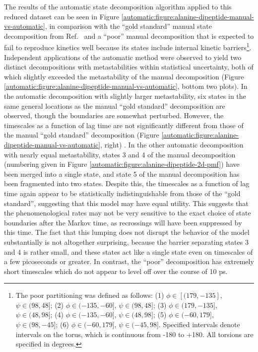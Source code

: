 The results of the automatic state decomposition algorithm applied to this reduced dataset can be seen in Figure \ref{automatic:figure:alanine-dipeptide-manual-vs-automatic}, in comparison with the ``gold standard'' manual state decomposition from Ref.\ \cite{chodera:mms:2006} and a ``poor'' manual decomposition that is expected to fail to reproduce kinetics well because its states include internal kinetic barriers\footnote{The poor partitioning was defined as follows: (1) $\phi \in [(179,-135]$, $\psi \in (98,48]$; (2) $\phi \in (-135,-60]$, $\psi \in (98,48]$; (3) $\phi \in (179,-135]$, $\psi \in (48,98]$; (4) $\phi \in (-135,-60]$, $\psi \in (48,98]$; (5) $\phi \in (-60,179]$, $\psi \in (98,-45]$; (6) $\phi \in (-60,179]$, $\psi \in (-45,98]$.  Specified intervals denote intervals on the torus, which is continuous from -180 to +180.  All torsions are specified in degrees.}.
Independent applications of the automatic method were observed to yield two distinct decompositions with metastabilities within statistical uncertainty, both of which slightly exceeded the metastability of the manual decomposition (Figure \ref{automatic:figure:alanine-dipeptide-manual-vs-automatic}, bottom two plots).
In the automatic decomposition with slightly larger metastability, six states in the same general locations as the manual ``gold standard'' decomposition are observed, though the boundaries are somewhat perturbed.
However, the timescales as a function of lag time are not significantly different from those of the manual ``gold standard'' decomposition  (Figure \ref{automatic:figure:alanine-dipeptide-manual-vs-automatic}, right) .
In the other automatic decomposition with nearly equal metastability, states 3 and 4 of the manual decomposition (numbering given in Figure \ref{automatic:figure:alanine-dipeptide-2d-pmf}) have been merged into a single state, and state 5 of the manual decomposition has been fragmented into two states.
Despite this, the timescales as a function of lag time again appear to be statistically indistinguishable from those of the ``gold standard'', suggesting that this model may have equal utility.
This suggests that the phenomenological rates may not be very sensitive to the exact choice of state boundaries after the Markov time, as recrossings will have been suppressed by this time.
The fact that this lumping does not disrupt the behavior of the model substantially is not altogether surprising, because the barrier separating states 3 and 4 is rather small, and these states act like a single state even on timescales of a few picoseconds or greater.
In contrast, the ``poor'' decomposition has extremely short timescales which do not appear to level off over the course of 10 ps.

